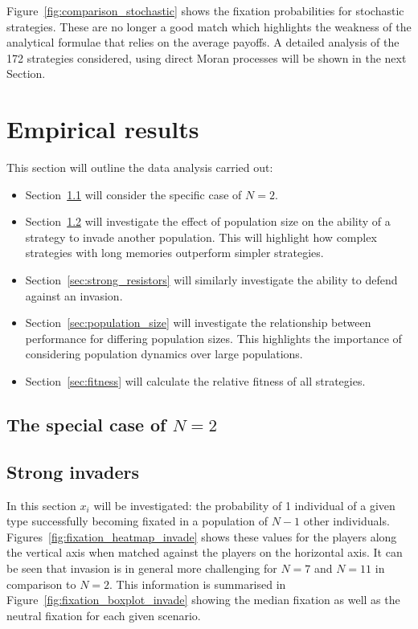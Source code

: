 \documentclass{article}
\begin{document}
Figure~\ref{fig:comparison_stochastic} shows the fixation probabilities for
stochastic strategies. These are no longer a good match which highlights the
weakness of the analytical formulae that relies on the average payoffs. A
detailed analysis of the 172 strategies considered, using direct Moran processes
will be shown in the next Section.

\section{Empirical results}\label{sec:empirical_results}

This section will outline the data analysis carried out:

\begin{itemize}
    \item Section~\ref{sec:two_individuals} will consider the specific case of
        \(N=2\).
    \item Section~\ref{sec:strong_invaders} will investigate the effect of
        population size on the ability of a strategy to invade another
        population. This will highlight how complex strategies with long
        memories outperform simpler strategies.
    \item Section~\ref{sec:strong_resistors} will similarly investigate the
        ability to defend against an invasion.
    \item Section~\ref{sec:population_size} will investigate the relationship
        between performance for differing population sizes. This highlights the
        importance of considering population dynamics over large populations.
    \item Section~\ref{sec:fitness} will calculate the relative fitness of all
        strategies.
\end{itemize}

\subsection{The special case of \(N=2\)}\label{sec:two_individuals}


\subsection{Strong invaders}\label{sec:strong_invaders}

In this section \(x_i\) will be investigated: the probability of 1 individual of
a given type successfully becoming fixated in a population of \(N - 1\) other
individuals. Figures~\ref{fig:fixation_heatmap_invade} shows these values for
the players along the vertical axis when matched against the players on the
horizontal axis. It can be seen that invasion is in general more challenging for
\(N=7\) and \(N=11\) in comparison to \(N=2\).
This information is summarised in Figure~\ref{fig:fixation_boxplot_invade}
showing the median fixation as well as the neutral fixation for each given
scenario.
\end{document}
